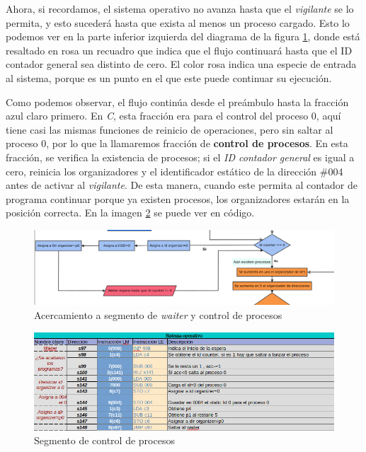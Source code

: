 \documentclass[letterpaper,12pt,oneside]{book}
\begin{document}
			
				Ahora, si recordamos, el sistema operativo no avanza hasta que el \textit{vigilante} se lo permita, y esto sucederá hasta que
				exista al menos un proceso cargado. Esto lo podemos ver en la parte inferior izquierda del diagrama de
				la figura \ref{fig:diag_somp_waiter}, donde
				está resaltado en rosa un recuadro que indica que el flujo continuará hasta que el ID contador general sea distinto de cero. El
				color
				rosa indica una especie de entrada al sistema, porque es un punto en el que este puede continuar su ejecución.
    
                Como
				podemos observar, el flujo continúa desde el preámbulo hasta la fracción azul claro primero. 
				En \textit{C}, esta fracción era para el control del proceso 0, aquí tiene casi las mismas funciones de
				reinicio de operaciones, pero sin saltar al proceso 0, por lo que la llamaremos fracción de \textbf{control de procesos}.
				 En esta fracción,
				se verifica la existencia de procesos; si el \textit{ID contador general} es igual a cero,
				reinicia los organizadores y el identificador estático de la dirección \#004  antes
				de activar al \textit{vigilante}. De esta manera, cuando este permita al contador de programa continuar porque ya
				existen procesos,
				los organizadores estarán en la posición correcta. En la imagen \ref{fig:somp_controlprocesos} se puede ver en código.
			
			
			\begin{figure}[h]		
				\centering
				\includegraphics[scale=0.45]{media/Paralela/diag_somp_waiter.png}
				\caption{ Acercamiento a segmento de  \textit{waiter} y control de procesos}
				\label{fig:diag_somp_waiter}
			\end{figure}	
			
			
			\begin{figure}[h]		
				\centering
				\includegraphics[scale=0.53]{media/Paralela/somp_controlprocesos.png}
				\caption{Segmento de control de procesos}
				\label{fig:somp_controlprocesos}
			\end{figure}	
			
\end{document}
